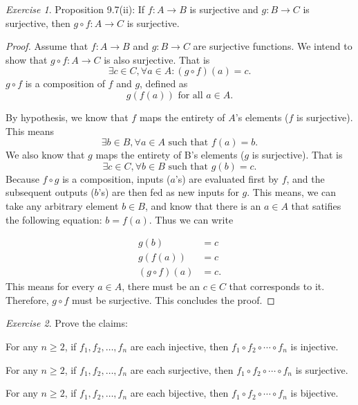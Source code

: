 \documentclass[12pt,oneside]{amsart}
\theoremstyle{remark}
\newtheorem{exer}{Exercise}
\begin{document}
\newpage
\begin{exer}
Proposition 9.7(ii): If $f: A \to B$ is surjective and $g: B \to C$ is surjective, then $g \circ f: A \to C$ is surjective.
%
\end{exer}

\begin{proof}
Assume that $f: A \to B$ and $g: B \to C$ are surjective functions. We intend to show that $g \circ f: A \to C$ is also surjective. That is \[ \exists c \in C, \forall a \in A: (g \circ f)(a) = c. \] $g \circ f$ is a composition of $f$ and $g$, defined as \[ g(f(a)) \text{ for all } a \in A. \]

By hypothesis, we know that $f$ maps the entirety of $A$'s elements ($f$ is surjective). This means \[ \exists b \in B, \forall a \in A \text{ such that } f(a) = b. \] We also know that $g$ maps the entirety of B's elements ($g$ is surjective). That is \[ \exists c \in C, \forall b \in B \text{ such that } g(b) = c. \] Because $f \circ g$ is a composition, inputs ($a$'s) are evaluated first by $f$, and the subsequent outputs ($b$'s) are then fed as new inputs for $g$. This means, we can take any arbitrary element $b \in B$, and know that there is an $a \in A$ that satifies the following equation: $b = f(a)$. Thus we can write

\begin{equation}
\begin{split}
         g(b) &= c \\
      g(f(a)) &= c \\
(g \circ f)(a) &= c.
\end{split}
\end{equation}
This means for every $a \in A$, there must be an $c \in C$ that corresponds to it. Therefore, $g \circ f$ must be surjective. This concludes the proof.
\end{proof}

\newpage
\begin{exer}
Prove the claims:

For any $n \geq 2$, if $f_1, f_2, \dotsc, f_n$ are each injective, then $f_1 \circ f_2 \circ \dotsb \circ f_n$ is injective.

For any $n \geq 2$, if $f_1, f_2, \dotsc, f_n$ are each surjective, then $f_1 \circ f_2 \circ \dotsb \circ f_n$ is surjective.

For any $n \geq 2$, if $f_1, f_2, \dotsc, f_n$ are each bijective, then $f_1 \circ f_2 \circ \dotsb \circ f_n$ is bijective.
%
\end{exer}
\end{document}

